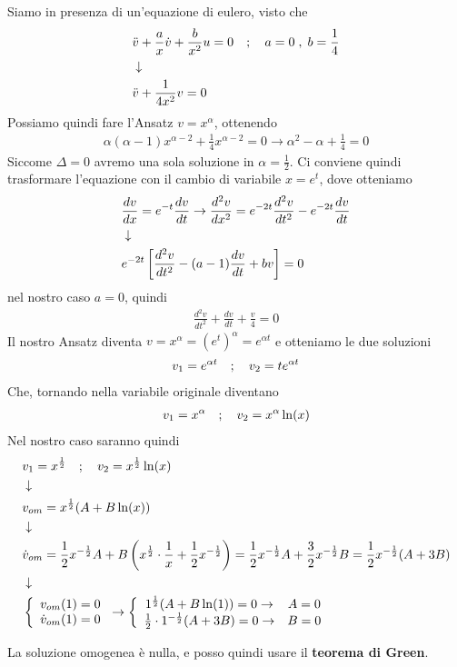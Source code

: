 Siamo in presenza di un'equazione di eulero, visto che
\begin{align}
	&\ddot{v}  + \frac{a}{x} \dot{v} + \frac{b}{x^2} u = 0 \quad ; \quad a=0 \; , \; b= \frac{1}{4} \\ &\downarrow \nonumber \\
	&	\ddot{v} +\frac{1}{4x^2} v = 0 
\end{align}
Possiamo quindi fare l'Ansatz $v = x^\alpha$, ottenendo
\begin{align}
	\alpha (\alpha -1) x^{\alpha -2} +\frac{1}{4} x^{\alpha -2} = 0 \to \alpha^2 - \alpha + \frac{1}{4} = 0 
\end{align}
Siccome $\Delta = 0$ avremo una sola soluzione in $\alpha = \frac{1}{2}$. Ci conviene quindi trasformare l'equazione con il cambio di variabile $x=e^{t}$, dove otteniamo
\begin{align}
	&\frac{dv}{dx} = e^{-t}\frac{dv}{dt} \to \frac{d^2v}{dx^2} = e^{-2t}\frac{d^2 v}{dt^2} - e^{-2t}\frac{dv}{dt} \\ &\downarrow \nonumber \\
	&e^{-2t} \left[ \frac{d^2 v}{dt^2} - (a-1) \frac{dv}{dt} + bv\right] = 0
\end{align}
nel nostro caso $a=0$, quindi
\begin{align}
	\frac{d^2 v}{dt^2} + \frac{dv}{dt} + \frac{v}{4}= 0
\end{align}
Il nostro  Ansatz diventa $v = x^\alpha = (e^t)^\alpha  = e^{\alpha t}$ e otteniamo le due soluzioni
\begin{align}
	v_1 = e^{\alpha t} \quad ; \quad v_2 = t e^{\alpha t} 
\end{align}
Che, tornando nella variabile originale diventano
\begin{align}
	v_1 = x^\alpha \quad ; \quad v_2 = x^\alpha \ln(x) 
\end{align}
Nel nostro caso saranno quindi
\begin{align}
	&v_1 = x^\frac{1}{2} \quad ; \quad v_2 = x^\frac{1}{2} \ln(x) \\ &\downarrow \nonumber \\
	&v_{om} = x^\frac{1}{2}(A + B\ln(x)) \\ &\downarrow \nonumber \\
	&\dot{v}_{om} = \frac{1}{2}x^{-\frac{1}{2}}A + B \left( x^\frac{1}{2} \cdot \frac{1}{x} + \frac{1}{2}x^{-\frac{1}{2}} \right) = \frac{1}{2}x^{-\frac{1}{2}} A + \frac{3}{2}x^{-\frac{1}{2}} B = \frac{1}{2}x^{-\frac{1}{2}} (A + 3B) \nonumber \\ &\downarrow \nonumber \\
	&\left\{ \begin{array}{cc} v_{om}(1) = 0\\ \dot{v}_{om}(1) = 0 \end{array} \right. \to \left\{ \begin{array}{cc} 1^\frac{1}{2}(A + B\ln(1)) = 0 \to& A = 0\\ \frac{1}{2}\cdot 1^{-\frac{1}{2}} (A + 3B)=0 \to& B = 0 \end{array} \right.
\end{align}

La soluzione omogenea è nulla, e posso quindi usare il \textbf{teorema di Green}.

